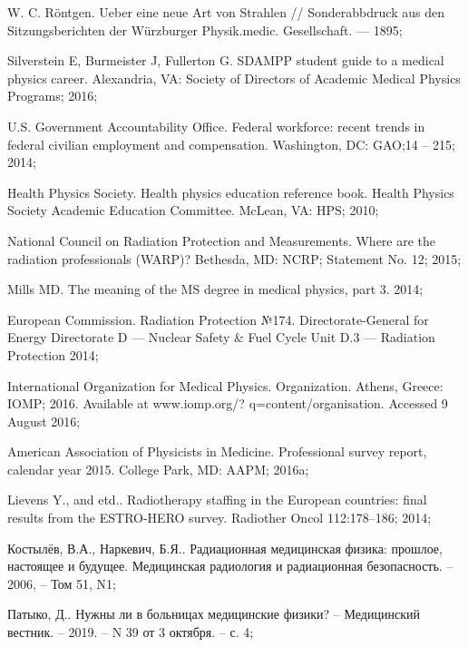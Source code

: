 
\begin{thebibliography}{99} %

W. C. Röntgen. Ueber eine neue Art von Strahlen // Sonderabbdruck aus den Sitzungsberichten der Würzburger Physik.medic. Gesellschaft. — 1895;

Silverstein E, Burmeister J, Fullerton G. SDAMPP student guide to a medical physics career. Alexandria, VA: Society of Directors of Academic Medical Physics Programs; 2016;

U.S. Government Accountability Office. Federal workforce: recent trends in federal civilian employment and compensation. Washington, DC: GAO;14 -- 215; 2014;

Health Physics Society. Health physics education reference book. Health Physics Society Academic Education Committee. McLean, VA: HPS; 2010;

National Council on Radiation Protection and Measurements. Where are the radiation professionals (WARP)? Bethesda, MD: NCRP; Statement No. 12; 2015;

Mills MD. The meaning of the MS degree in medical physics, part 3. 2014;

European Commission. Radiation Protection №174. Directorate-General for Energy Directorate D — Nuclear Safety \& Fuel Cycle Unit D.3 — Radiation Protection
2014;

International Organization for Medical Physics. Organization. Athens, Greece: IOMP; 2016. Available at www.iomp.org/? q=content/organisation. Accessed 9 August 2016;

American Association of Physicists in Medicine. Professional survey report, calendar year 2015. College Park, MD: AAPM; 2016a;

Lievens Y., and etd.. Radiotherapy staffing in the European countries: final results from the ESTRO-HERO survey. Radiother Oncol 112:178–186; 2014;


Костылёв, В.А., Наркевич, Б.Я.. Радиационная медицинская физика: прошлое, настоящее и будущее. Медицинская радиология и радиационная безопасность. -- 2006, --  Том 51, N1;

Патыко, Д.. Нужны ли в больницах медицинские физики? -- Медицинский вестник. -- 2019. -- N 39 от 3 октября. -- с. 4;


\end{thebibliography}
